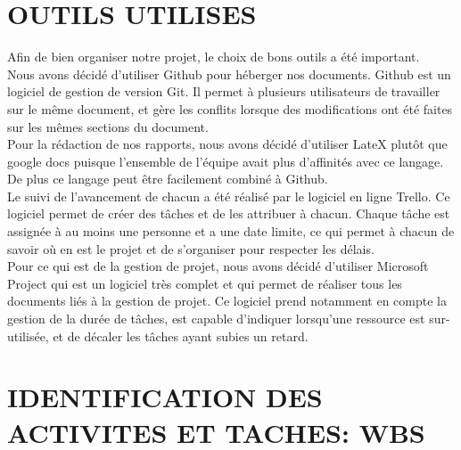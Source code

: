\documentclass[]{scrartcl}
\begin{document}
\section{OUTILS UTILISES}
Afin de bien organiser notre projet, le choix de bons outils a été important. \\
Nous avons décidé d'utiliser Github pour héberger nos documents. Github est un logiciel de gestion de version Git. Il permet à plusieurs utilisateurs de travailler sur le même document, et gère les conflits lorsque des modifications ont été faites sur les mêmes sections du document. \\
Pour la rédaction de nos rapports, nous avons décidé d'utiliser LateX plutôt que google docs puisque l'ensemble de l'équipe avait plus d'affinités avec ce langage. De plus ce langage peut être facilement combiné à Github. \\
Le suivi de l'avancement de chacun a été réalisé par le logiciel en ligne Trello. Ce logiciel permet de créer des tâches et de les attribuer à chacun. Chaque tâche est assignée à au moins une personne et a une date limite, ce qui permet à chacun de savoir où en est le projet et de s'organiser pour respecter les délais. \\

Pour ce qui est de la gestion de projet, nous avons décidé d'utiliser Microsoft Project qui est un logiciel très complet et qui permet de réaliser tous les documents liés à la gestion de projet. Ce logiciel prend notamment en compte la gestion de la durée de tâches, est capable d'indiquer lorsqu'une ressource est sur-utilisée, et de décaler les tâches ayant subies un retard. 

\section{IDENTIFICATION DES ACTIVITES ET TACHES: WBS}
\end{document}
